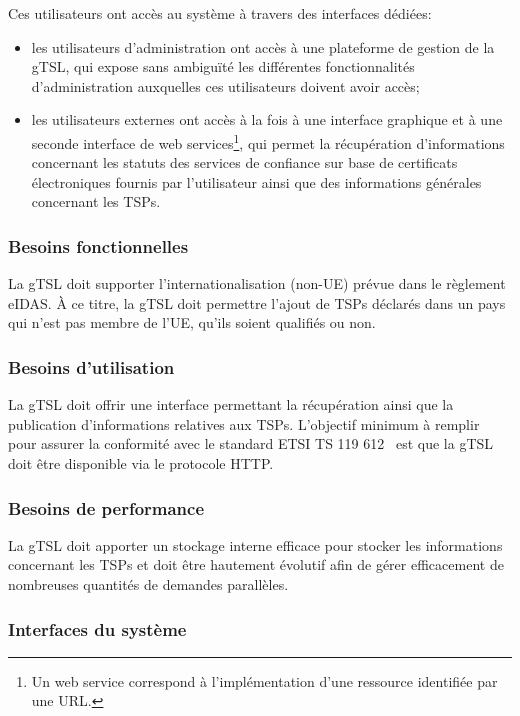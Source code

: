 \documentclass{tnreport}
\begin{document}
Ces utilisateurs ont accès au système à travers des interfaces dédiées:
\begin{itemize}
	\item les utilisateurs d'administration ont accès à une plateforme de gestion de la gTSL, qui expose sans ambiguïté les différentes fonctionnalités d'administration auxquelles ces utilisateurs doivent avoir accès;
	\item les utilisateurs externes ont accès à la fois à une interface graphique et à une seconde interface de web services\footnote{Un web service correspond à l'implémentation d'une ressource identifiée par une URL.}, qui permet la récupération d'informations concernant les statuts des services de confiance sur base de certificats électroniques fournis par l'utilisateur ainsi que des informations générales concernant les TSPs.
\end{itemize}

\subsubsection{Besoins fonctionnelles}

La gTSL doit supporter l'internationalisation (non-UE) prévue dans le règlement eIDAS. À ce titre, la gTSL doit permettre l'ajout de TSPs déclarés dans un pays qui n'est pas membre de l'UE, qu'ils soient qualifiés ou non.

\subsubsection{Besoins d'utilisation}

La gTSL doit offrir une interface permettant la récupération ainsi que la publication d'informations relatives aux TSPs. L'objectif minimum à remplir pour assurer la conformité avec le standard ETSI TS 119 612~\cite{ETSITS119612} est que la gTSL doit être disponible via le protocole HTTP.

\subsubsection{Besoins de performance}

La gTSL doit apporter un stockage interne efficace pour stocker les informations concernant les TSPs et doit être hautement évolutif afin de gérer efficacement de nombreuses quantités de demandes parallèles.

\subsubsection{Interfaces du système}
\end{document}
